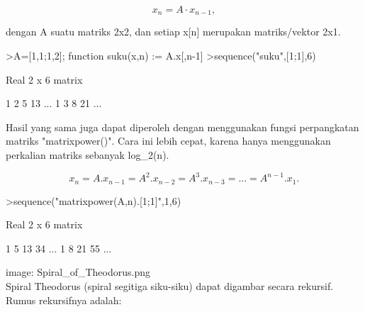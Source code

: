 \documentclass[a4paper,10pt]{article}
\begin{document}
\begin{eulernotebook}
\begin{eulercomment}
\begin{eulercomment}
\begin{eulercomment}
\begin{eulercomment}
\begin{eulercomment}
\begin{eulercomment}
\begin{eulercomment}
\begin{eulercomment}
\begin{eulercomment}
\begin{eulercomment}
\begin{eulercomment}
\begin{eulercomment}
\begin{eulercomment}
\begin{eulercomment}
\begin{eulercomment}
\begin{eulercomment}
\begin{eulercomment}
\end{eulercomment}
\begin{eulerformula}
\[
x_n =A \cdot x_{n-1},
\]
\end{eulerformula}
\begin{eulercomment}
dengan A suatu matriks 2x2, dan setiap x[n] merupakan matriks/vektor 2x1.
\end{eulercomment}
\begin{eulerprompt}
>A=[1,1;1,2]; function suku(x,n) := A.x[,n-1]
>sequence("suku",[1;1],6)
\end{eulerprompt}
\begin{euleroutput}
  Real 2 x 6 matrix
  
              1             2             5            13     ...
              1             3             8            21     ...
\end{euleroutput}
\begin{eulercomment}
Hasil yang sama juga dapat diperoleh dengan menggunakan fungsi perpangkatan matriks
"matrixpower()". Cara ini lebih cepat, karena hanya menggunakan perkalian matriks sebanyak
log\_2(n).

\end{eulercomment}
\begin{eulerformula}
\[
x_n=A.x_{n-1}=A^2.x_{n-2}=A^3.x_{n-3}= ... = A^{n-1}.x_1.
\]
\end{eulerformula}
\begin{eulerprompt}
>sequence("matrixpower(A,n).[1;1]",1,6)
\end{eulerprompt}
\begin{euleroutput}
  Real 2 x 6 matrix
  
              1             5            13            34     ...
              1             8            21            55     ...
\end{euleroutput}
\begin{eulercomment}
image: Spiral\_of\_Theodorus.png\\
Spiral Theodorus (spiral segitiga siku-siku) dapat digambar secara rekursif. Rumus
rekursifnya adalah:


\end{eulercomment}
\end{eulercomment}
\end{eulercomment}
\end{eulercomment}
\end{eulercomment}
\end{eulercomment}
\end{eulercomment}
\end{eulercomment}
\end{eulercomment}
\end{eulercomment}
\end{eulercomment}
\end{eulercomment}
\end{eulercomment}
\end{eulercomment}
\end{eulercomment}
\end{eulercomment}
\end{eulercomment}
\end{eulernotebook}
\end{document}
